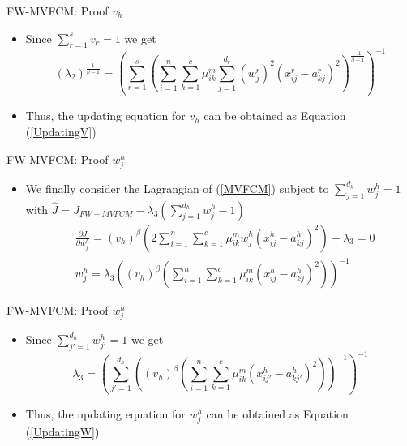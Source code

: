 \documentclass[compress,sky blue]{beamer}
\begin{document}
\begin{frame}{FW-MVFCM: Proof $v_{h}$}
	\vspace{-0.3cm}	
    \begin{itemize}
    
    \item Since $\sum_{r=1}^{s}v_{r}=1 $ we get
  \begin{equation}
\scriptstyle\left(\lambda_{2}\right)^\frac{1}{\beta-1}=\left(\sum_{r=1}^{s}\left(\sum_{i=1}^{n}\sum_{k=1}^{c}  \mu_{ik}^{m} \sum_{j=1}^{d_{r}} (w_j^{r})^2  \left(x_{ij}^{r}-a_{kj}^{r}\right)^2\right)^\frac{-1}{\beta-1}\right)^{-1}
\end{equation}
\item Thus, the updating equation for $v_{h}$ can be obtained as Equation (\ref{UpdatingV})  
	\end{itemize}
\end{frame}


\begin{frame}{FW-MVFCM: Proof $w_{j}^{h}$}
	\vspace{-0.3cm}	
    \begin{itemize}
    
    \item We finally consider the Lagrangian of  (\ref{MVFCM}) subject to $\sum_{j=1}^{d_{h}}w_{j}^{h}=1 $ with  $\hat{J}=J_{FW-MVFCM}-\lambda_{3} \left(\sum_{j=1}^{d_{h}}w_{j}^{h}-1\right)$
    \begin{align}
& \frac{\partial \tilde{J}}{\partial w_{j}^{h}}=\left(v_{h}\right)^\beta\left(2\sum_{i=1}^{n}\sum_{k=1}^{c}  \mu_{ik}^{m} w_{j}^{h}  \left(x_{ij}^{h}-a_{kj}^{h}\right)^2\right)-\lambda_{3}=0\\
& w_{j}^{h}=\lambda_{3}\left(\left(v_{h}\right)^\beta\left(\sum_{i=1}^{n}\sum_{k=1}^{c}  \mu_{ik}^{m}  \left(x_{ij}^{h}-a_{kj}^{h}\right)^2\right)\right)^{-1}
\end{align}
	\end{itemize}
\end{frame}

\begin{frame}{FW-MVFCM: Proof $w_{j}^{h}$}
	\vspace{-0.3cm}	
    \begin{itemize}
    
    \item Since $\sum_{j'=1}^{d_{h}}w_{j'}^{h}=1 $ we get
  \begin{equation}
\lambda_{3}=\left(\sum_{j'=1}^{d_{h}}\left(\left(v_{h}\right)^{\beta}\left(\sum_{i=1}^{n}\sum_{k=1}^{c}  \mu_{ik}^{m}  \left(x_{ij'}^{h}-a_{kj'}^{h}\right)^2\right)\right)^{-1}\right)^{-1}
\end{equation}
\item Thus, the updating equation for $w_{j}^{h}$ can be obtained as Equation (\ref{UpdatingW})  
	\end{itemize}
\end{frame}
\end{document}
